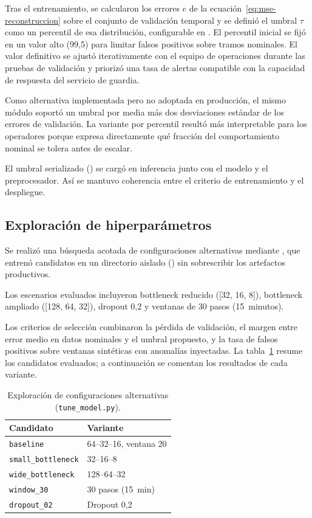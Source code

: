 Tras el entrenamiento, se calcularon los errores $e$ de la ecuación~\eqref{eq:mse-reconstruccion} sobre el conjunto de validación temporal y se definió el umbral $\tau$ como un percentil de esa distribución, configurable en . El percentil inicial se fijó en un valor alto (99,5) para limitar falsos positivos sobre tramos nominales. El valor definitivo se ajustó iterativamente con el equipo de operaciones durante las pruebas de validación y priorizó una tasa de alertas compatible con la capacidad de respuesta del servicio de guardia.

Como alternativa implementada pero no adoptada en producción, el mismo módulo soportó un umbral por media más dos desviaciones estándar de los errores de validación. La variante por percentil resultó más interpretable para los operadores porque expresa directamente qué fracción del comportamiento nominal se tolera antes de escalar.

El umbral serializado () se cargó en inferencia junto con el modelo y el preprocesador. Así se mantuvo coherencia entre el criterio de entrenamiento y el despliegue.

\subsection{Exploración de hiperparámetros}

Se realizó una búsqueda acotada de configuraciones alternativas mediante , que entrenó candidatos en un directorio aislado () sin sobrescribir los artefactos productivos.

Los escenarios evaluados incluyeron bottleneck reducido ([32, 16, 8]), bottleneck ampliado ([128, 64, 32]), dropout 0,2 y ventanas de 30 pasos (15~minutos).

Los criterios de selección combinaron la pérdida de validación, el margen entre error medio en datos nominales y el umbral propuesto, y la tasa de falsos positivos sobre ventanas sintéticas con anomalías inyectadas. La tabla~\ref{tab:tuning-candidatos} resume los candidatos evaluados; a continuación se comentan los resultados de cada variante.

\begin{table}[h]
\centering
\caption{Exploración de configuraciones alternativas (\texttt{tune\_model.py}).}
\label{tab:tuning-candidatos}
\begin{tabular}{@{}ll@{}}
\toprule
\textbf{Candidato} & \textbf{Variante} \\
\midrule
\texttt{baseline} & 64--32--16, ventana 20 \\
\texttt{small\_bottleneck} & 32--16--8 \\
\texttt{wide\_bottleneck} & 128--64--32 \\
\texttt{window\_30} & 30 pasos (15~min) \\
\texttt{dropout\_02} & Dropout 0,2 \\
\bottomrule
\end{tabular}
\end{table}

